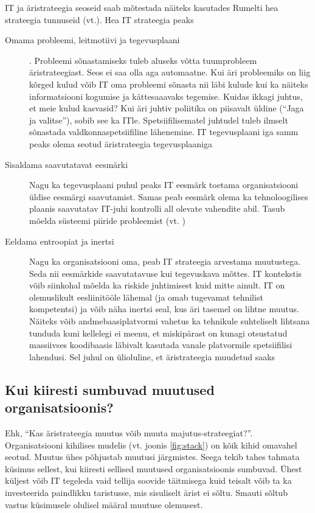 \documentclass{tufte-book}
\begin{document}
IT ja äristrateegia seoseid saab mõtestada näiteks kasutades Rumelti hea strateegia tunnuseid (vt.). Hea IT strateegia peaks
\begin{description}
	\item[Omama probleemi, leitmotiivi ja tegevusplaani]. Probleemi sõnastamiseks tuleb aluseks võtta tuumprobleem äristrateegiast. Seos ei saa olla aga automaatne. Kui äri probleemiks on liig kõrged kulud võib IT oma probleemi sõnasta nii läbi kulude kui ka näiteks informatsiooni kogumise ja kättesaaavaks tegemise. Kuidas ikkagi juhtus, et meie kulud kasvasid? Kui äri juhtiv poliitika on piisavalt üldine (\enquote{Jaga ja valitse}), sobib see ka ITle. Spetsiifilisematel juhtudel tuleb ilmselt sõnastada valdkonnaspetsiifiline lähenemine. IT tegevusplaani iga samm peaks olema seotud äristrateegia tegevusplaaniga
	\item[Sisaldama saavutatavat eesmärki] Nagu ka tegevusplaani puhul peaks IT eesmärk toetama organisatsiooni üldise eesmärgi saavutamist. Samas peab eesmärk olema ka tehnoloogilises plaanis saavutatav IT-juhi kontrolli all olevate vahendite abil. Tasub mõelda süsteemi piiride probleemist (vt. )
	\item[Eeldama entroopiat ja inertsi] Nagu ka organisatsiooni oma, peab IT strateegia arvestama muutustega. Seda nii eesmärkide saavutatavuse kui tegevuskava mõttes. IT kontekstis võib siinkohal mõelda ka riskide juhtimisest kuid mitte ainult. IT on olemuslikult eesliinitööle lähemal (ja omab tugevamat tehnilist kompetentsi) ja võib näha inertsi seal, kus äri tasemel on lihtne muutus. Näiteks võib andmebaasiplatvormi vahetus ka tehnikule suhteliselt lihtsana tunduda kuni kellelegi ei meenu, et miskipärast on kunagi otsustatud massiivses koodibaasis läbivalt kasutada vanale platvormile spetsiifilisi lahendusi. Sel juhul on ülioluline, et äristrateegia muudetud saaks
\end{description}

\subsection{Kui kiiresti sumbuvad muutused organisatsioonis?}
Ehk, \enquote{Kas äristrateegia muutus võib muuta majutus-strateegiat?}. Organisatsiooni kihilises mudelis (vt. joonis \ref{fig:stack}) on kõik kihid omavahel seotud. Muutus ühes põhjustab muutusi järgmistes. Seega tekib tahes tahmata küsimus sellest, kui kiiresti sellised muutused organisatsioonis sumbuvad. Ühest küljest võib IT tegeleda vaid tellija soovide täitmisega kuid teisalt võib ta ka investeerida paindlikku taristusse, mis sisuliselt ärist ei sõltu. Smauti sõltub vastus küsimusele olulisel määral muutuse olemusest.
\end{document}
